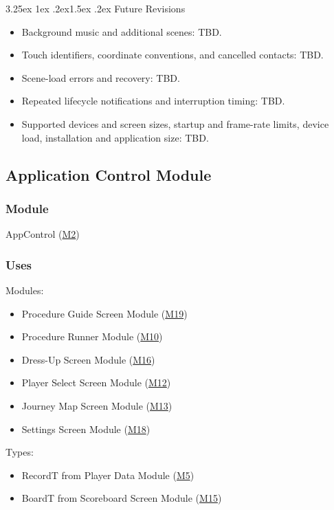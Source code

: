 \documentclass[10pt, titlepage]{article}
\makeatletter
\newcommand{\misref}[2]{\hyperref[mis:#1]{M#2}}
\renewcommand\paragraph{\@startsection{paragraph}{4}{\z@}%
  {3.25ex \@plus 1ex \@minus .2ex}{1.5ex \@plus .2ex}%
  {\normalfont\normalsize\bfseries}}
\makeatother
\begin{document}
\paragraph{Future Revisions}

\begin{itemize}
\item Background music and additional scenes: TBD.
\item Touch identifiers, coordinate conventions, and cancelled contacts: TBD.
\item Scene-load errors and recovery: TBD.
\item Repeated lifecycle notifications and interruption timing: TBD.
\item Supported devices and screen sizes, startup and frame-rate limits,
  device load, installation and application size: TBD.
\end{itemize}

\newpage
\subsection{Application Control Module} \label{mis:Control}

\subsubsection{Module}

AppControl (\misref{Control}{2})

\subsubsection{Uses}

Modules:
\begin{itemize}
\item Procedure Guide Screen Module (\misref{Guide}{19})
\item Procedure Runner Module (\misref{Runner}{10})
\item Dress-Up Screen Module (\misref{DressUp}{16})
\item Player Select Screen Module (\misref{PlayerSelect}{12})
\item Journey Map Screen Module (\misref{Map}{13})
\item Settings Screen Module (\misref{Settings}{18})
\end{itemize}

Types:
\begin{itemize}
\item RecordT from Player Data Module (\misref{PlayerData}{5})
\item BoardT from Scoreboard Screen Module (\misref{Scoreboard}{15})
\end{itemize}
\end{document}
